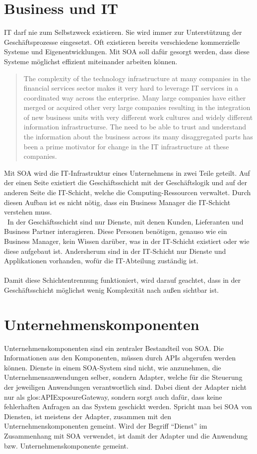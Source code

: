 \section{Business und IT}
\label{sec:BusinessAndIT}
IT darf nie zum Selbstzweck existieren. Sie wird immer zur Unterstützung der Geschäftsprozesse eingesetzt. Oft existieren bereits verschiedene kommerzielle Systeme und Eigenentwicklungen. Mit SOA soll dafür gesorgt werden, dass diese Systeme möglichst effizient miteinander arbeiten können.
\begin{quotation}
    \frqq The complexity of the technology infrastructure at many companies in the financial services sector makes it very hard to leverage IT services in a coordinated way across the enterprise. Many large companies have either merged or acquired other very large companies resulting in the integration of new business units with very different work cultures and widely different information infrastructurse. The need to be able to trust and understand the information about the business across its many disaggregated parts has been a prime motivator for change in the IT infrastructure at these companies.\flqq\  \cite[S. 17]{SOAForDummies}
\end{quotation}

Mit SOA wird die IT-Infrastruktur eines Unternehmens in zwei Teile geteilt. Auf der einen Seite existiert die Geschäftsschicht mit der Geschäftslogik und auf der anderen Seite die IT-Schicht, welche die Computing-Ressourcen verwaltet. Durch diesen Aufbau ist es nicht nötig, dass ein Business Manager die IT-Schicht verstehen muss.
\\\
In der Geschäftsschicht sind nur Dienste, mit denen Kunden, Lieferanten und Business Partner interagieren. Diese Personen benötigen, genauso wie ein Business Manager, kein Wissen darüber, was in der IT-Schicht existiert oder wie diese aufgebaut ist. Andersherum sind in der IT-Schicht nur Dienste und Applikationen vorhanden, wofür die IT-Abteilung zuständig ist.
\\\\
Damit diese Schichtentrennung funktioniert, wird darauf geachtet, dass in der Geschäftsschicht möglichst wenig Komplexität nach außen sichtbar ist.

\section{Unternehmenskomponenten}
\label{sec:UnternehmensKomponenten}
Unternehmenskomponenten sind ein zentraler Bestandteil von SOA. Die Informationen aus den Komponenten, müssen durch APIs abgerufen werden können. Dienste in einem SOA-System sind nicht, wie anzunehmen, die Unternehmensanwendungen selber, sondern Adapter, welche für die Steuerung der jeweiligen Anwendungen verantwortlich sind. Dabei dient der Adapter nicht nur als \gls{glos:APIExposureGateway}, sondern sorgt auch dafür, dass keine fehlerhaften Anfragen an das System geschickt werden. Spricht man bei SOA von Diensten, ist meistens der Adapter, zusammen mit den Unternehmenskomponenten gemeint. Wird der Begriff "`Dienst"' im Zusammenhang mit SOA verwendet, ist damit der Adapter und die Anwendung bzw. Unternehmenskomponente gemeint.


